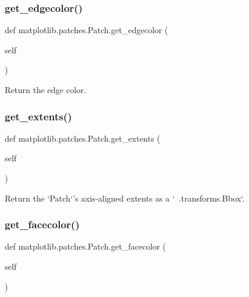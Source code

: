 \subsubsection{\texorpdfstring{get\+\_\+edgecolor()}{get\_edgecolor()}}
{\footnotesize\ttfamily def matplotlib.\+patches.\+Patch.\+get\+\_\+edgecolor (\begin{DoxyParamCaption}\item[{}]{self }\end{DoxyParamCaption})}

\begin{DoxyVerb}Return the edge color.\end{DoxyVerb}
 \mbox{\label{classmatplotlib_1_1patches_1_1Patch_ac4496e71fecd194a6632ac7ffaf7bf23}} 
\subsubsection{\texorpdfstring{get\+\_\+extents()}{get\_extents()}}
{\footnotesize\ttfamily def matplotlib.\+patches.\+Patch.\+get\+\_\+extents (\begin{DoxyParamCaption}\item[{}]{self }\end{DoxyParamCaption})}

\begin{DoxyVerb}Return the `Patch`'s axis-aligned extents as a `~.transforms.Bbox`.
\end{DoxyVerb}
 \mbox{\label{classmatplotlib_1_1patches_1_1Patch_ad1334dca84a093592bc52f4671561e1a}} 
\subsubsection{\texorpdfstring{get\+\_\+facecolor()}{get\_facecolor()}}
{\footnotesize\ttfamily def matplotlib.\+patches.\+Patch.\+get\+\_\+facecolor (\begin{DoxyParamCaption}\item[{}]{self }\end{DoxyParamCaption})}

